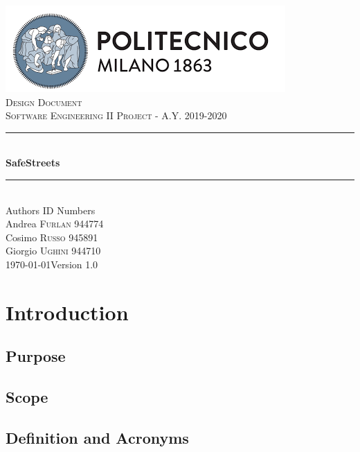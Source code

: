 \documentclass[12pt]{article}
\begin{document}
	\begin{titlepage}
		\newcommand{\HRule}{\rule{\linewidth}{0.7mm}}
		\center
		\includegraphics[width=\textwidth]{PolimiLogo.png}\\[1cm]
		
		\textsc{\LARGE Design Document}\\[1cm]
		\textsc{\large Software Engineering II Project - A.Y. 2019-2020}\\[1cm]
		\HRule \\[0.4cm]
		{ \huge \bfseries SafeStreets}\\[0.15cm]
		\HRule \\[1.5cm]
		{\large Authors  \hfill ID Numbers}\\[0.4cm]
		{\large Andrea \textsc{Furlan}  \hfill 944774}\\[0.2cm]
		{\large Cosimo \textsc{Russo}  \hfill 945891}\\[0.2cm]
		{\large Giorgio \textsc{Ughini} \hfill 944710}\\[2cm]
		{\large \today  \hfill Version 1.0}
		\vfill
	\end{titlepage}
\clearpage

{\hypersetup{hidelinks}\tableofcontents}
\clearpage
\setlength{\parskip}{1em}
\section{Introduction}
\subsection{Purpose}


\subsection{Scope}

\clearpage

\subsection{Definition and Acronyms}
\end{document}
